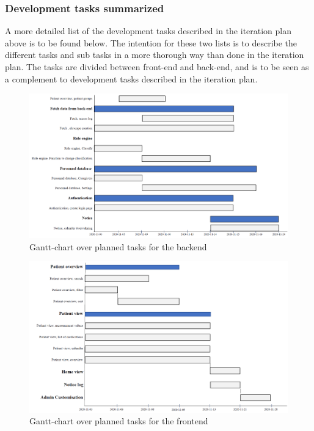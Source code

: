 \subsubsection{Development tasks summarized}
A more detailed list of the development tasks described in the iteration plan above is to be found below. The intention for these two lists is to describe the different tasks and sub tasks in a more thorough way than done in the iteration plan. The tasks are divided between front-end and back-end, and is to be seen as a complement to development tasks described in the iteration plan.  
\begin{figure}[hbt!]
\centering
\includegraphics[width=\linewidth]{Pictures/DevTasksBackend.PNG}
\caption{Gantt-chart over planned tasks for the backend}
\label{fig:backend}
\end{figure}
\begin{figure}[hbt!]
\centering
\includegraphics[width=\linewidth]{Pictures/DevTasksFrontend.PNG}
\caption{Gantt-chart over planned tasks for the frontend}
\label{fig:fronten}
\end{figure}

